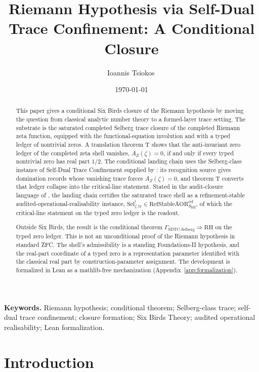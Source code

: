 \documentclass[11pt]{article}
\title{Riemann Hypothesis via Self-Dual Trace Confinement: A Conditional Closure}
\author{Ioannis Tsiokos\,\orcidlink{0009-0009-7659-5964}}
\date{\today}
\newcommand{\AZ}{A_{Z}(\zeta)}
\newcommand{\Sel}{\mathrm{Sel}^{!}_{\zeta,\mathrm{tr}}}
\theoremstyle{definition}
\begin{document}
\maketitle
\thispagestyle{firstpage}

\begin{abstract}
This paper gives a conditional Six Birds closure of the Riemann
hypothesis by moving the question from classical analytic number
theory to a formed-layer trace setting.  The substrate is the
saturated completed Selberg trace closure of the completed Riemann
zeta function, equipped with the functional-equation involution and
with a typed ledger of nontrivial zeros.  A translation theorem T
shows that the anti-invariant zero ledger of the completed zeta
shell vanishes, \(\AZ=0\), if and only if every typed nontrivial
zero has real part \(1/2\).  The conditional
landing chain uses the Selberg-class instance of Self-Dual Trace
Confinement supplied by \citet{TsiokosSDTC2026}: its recognition
source gives domination records whose vanishing trace forces
\(\AZ=0\), and theorem T converts that ledger collapse into the
critical-line statement.
Stated in the audit-closure language of \citet{TsiokosAOR2026},
the landing chain certifies the saturated trace shell as a
refinement-stable audited-operational-realisability instance,
\(\Sel\in\mathrm{RefStableAOR}^{\mathrm{ref}}_{S_{\mathrm{RH}}}\),
of which the critical-line statement on the typed zero ledger is
the readout.

Outside Six Birds, the result is the conditional theorem
\(\Gamma_{\mathrm{SDTC}\text{-}\mathrm{Selberg}}\Rightarrow
\mathrm{RH}\) on the typed zero ledger.  This is not an unconditional
proof of the Riemann hypothesis in standard ZFC.
The shell's admissibility is a standing Foundations-II hypothesis, and
the real-part coordinate of a typed zero is a representation parameter
identified with the classical real part by construction-parameter
assignment.  The development is formalized in Lean as a mathlib-free
mechanization (Appendix~\ref{app:formalization}).
\end{abstract}

\medskip
\noindent\textbf{Keywords.} Riemann hypothesis; conditional theorem; Selberg-class trace; self-dual trace confinement; closure formation; Six Birds Theory; audited operational realisability; Lean formalization.



\section{Introduction}
\label{sec:intro}
\end{document}
